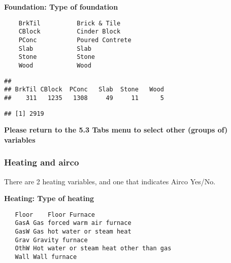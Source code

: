 \documentclass[]{article}
\newenvironment{Shaded}{\begin{snugshade}}{\end{snugshade}}
\newcommand{\KeywordTok}[1]{\textcolor[rgb]{0.13,0.29,0.53}{\textbf{#1}}}
\newcommand{\StringTok}[1]{\textcolor[rgb]{0.31,0.60,0.02}{#1}}
\newcommand{\CommentTok}[1]{\textcolor[rgb]{0.56,0.35,0.01}{\textit{#1}}}
\newcommand{\OperatorTok}[1]{\textcolor[rgb]{0.81,0.36,0.00}{\textbf{#1}}}
\newcommand{\NormalTok}[1]{#1}
\begin{document}
\textbf{Foundation: Type of foundation}

\begin{verbatim}
    BrkTil          Brick & Tile
    CBlock          Cinder Block
    PConc           Poured Contrete 
    Slab            Slab
    Stone           Stone
    Wood            Wood
\end{verbatim}

\begin{Shaded}
\end{Shaded}

\begin{verbatim}
## 
## BrkTil CBlock  PConc   Slab  Stone   Wood 
##    311   1235   1308     49     11      5
\end{verbatim}

\begin{Shaded}
\end{Shaded}

\begin{verbatim}
## [1] 2919
\end{verbatim}

\textbf{Please return to the 5.3 Tabs menu to select other (groups of)
variables}

\subsubsection{Heating and airco}\label{heating-and-airco}

There are 2 heating variables, and one that indicates Airco Yes/No.

\textbf{Heating: Type of heating}

\begin{verbatim}
   Floor    Floor Furnace
   GasA Gas forced warm air furnace
   GasW Gas hot water or steam heat
   Grav Gravity furnace 
   OthW Hot water or steam heat other than gas
   Wall Wall furnace
   
\end{verbatim}
\end{document}
